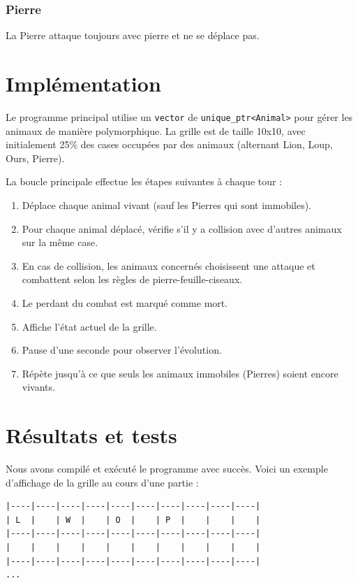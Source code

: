 \documentclass[a4paper,12pt,french]{article}
\begin{document}
\subsubsection{Pierre}

La Pierre attaque toujours avec pierre et ne se déplace pas.

\section{Implémentation}

Le programme principal utilise un \texttt{vector} de \texttt{unique\_ptr<Animal>} pour gérer les animaux de manière polymorphique. La grille est de taille 10x10, avec initialement 25\% des cases occupées par des animaux (alternant Lion, Loup, Ours, Pierre).

La boucle principale effectue les étapes suivantes à chaque tour :
\begin{enumerate}
  \item Déplace chaque animal vivant (sauf les Pierres qui sont immobiles).
  \item Pour chaque animal déplacé, vérifie s'il y a collision avec d'autres animaux sur la même case.
  \item En cas de collision, les animaux concernés choisissent une attaque et combattent selon les règles de pierre-feuille-ciseaux.
  \item Le perdant du combat est marqué comme mort.
  \item Affiche l'état actuel de la grille.
  \item Pause d'une seconde pour observer l'évolution.
  \item Répète jusqu'à ce que seuls les animaux immobiles (Pierres) soient encore vivants.
\end{enumerate}

\section{Résultats et tests}

Nous avons compilé et exécuté le programme avec succès. Voici un exemple d'affichage de la grille au cours d'une partie :

\begin{verbatim}
|----|----|----|----|----|----|----|----|----|----|
| L  |    | W  |    | O  |    | P  |    |    |    |
|----|----|----|----|----|----|----|----|----|----|
|    |    |    |    |    |    |    |    |    |    |
|----|----|----|----|----|----|----|----|----|----|
...
\end{verbatim}
\end{document}
